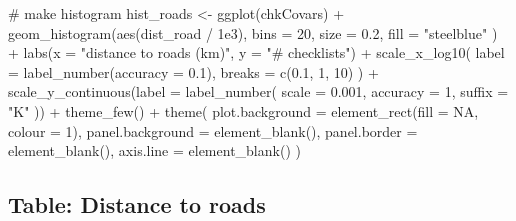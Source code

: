 \documentclass[]{article}
\newenvironment{Shaded}{}{}
\newcommand{\CommentTok}[1]{\textcolor[rgb]{0.00,0.50,0.00}{#1}}
\newcommand{\DataTypeTok}[1]{#1}
\newcommand{\DecValTok}[1]{#1}
\newcommand{\FloatTok}[1]{#1}
\newcommand{\KeywordTok}[1]{\textcolor[rgb]{0.00,0.00,1.00}{#1}}
\newcommand{\NormalTok}[1]{#1}
\newcommand{\OperatorTok}[1]{#1}
\newcommand{\OtherTok}[1]{\textcolor[rgb]{1.00,0.25,0.00}{#1}}
\newcommand{\StringTok}[1]{\textcolor[rgb]{0.00,0.50,0.50}{#1}}
\begin{document}
\begin{Shaded}
\begin{Highlighting}[]

\CommentTok{# make histogram}
\NormalTok{hist_roads <-}\StringTok{ }\KeywordTok{ggplot}\NormalTok{(chkCovars) }\OperatorTok{+}
\StringTok{  }\KeywordTok{geom_histogram}\NormalTok{(}\KeywordTok{aes}\NormalTok{(dist_road }\OperatorTok{/}\StringTok{ }\FloatTok{1e3}\NormalTok{),}
    \DataTypeTok{bins =} \DecValTok{20}\NormalTok{, }\DataTypeTok{size =} \FloatTok{0.2}\NormalTok{, }\DataTypeTok{fill =} \StringTok{"steelblue"}
\NormalTok{  ) }\OperatorTok{+}
\StringTok{  }\KeywordTok{labs}\NormalTok{(}\DataTypeTok{x =} \StringTok{"distance to roads (km)"}\NormalTok{, }\DataTypeTok{y =} \StringTok{"# checklists"}\NormalTok{) }\OperatorTok{+}
\StringTok{  }\KeywordTok{scale_x_log10}\NormalTok{(}
    \DataTypeTok{label =} \KeywordTok{label_number}\NormalTok{(}\DataTypeTok{accuracy =} \FloatTok{0.1}\NormalTok{),}
    \DataTypeTok{breaks =} \KeywordTok{c}\NormalTok{(}\FloatTok{0.1}\NormalTok{, }\DecValTok{1}\NormalTok{, }\DecValTok{10}\NormalTok{)}
\NormalTok{  ) }\OperatorTok{+}
\StringTok{  }\KeywordTok{scale_y_continuous}\NormalTok{(}\DataTypeTok{label =} \KeywordTok{label_number}\NormalTok{(}
    \DataTypeTok{scale =} \FloatTok{0.001}\NormalTok{,}
    \DataTypeTok{accuracy =} \DecValTok{1}\NormalTok{, }\DataTypeTok{suffix =} \StringTok{"K"}
\NormalTok{  )) }\OperatorTok{+}
\StringTok{  }\KeywordTok{theme_few}\NormalTok{() }\OperatorTok{+}
\StringTok{  }\KeywordTok{theme}\NormalTok{(}
    \DataTypeTok{plot.background =} \KeywordTok{element_rect}\NormalTok{(}\DataTypeTok{fill =} \OtherTok{NA}\NormalTok{, }\DataTypeTok{colour =} \DecValTok{1}\NormalTok{),}
    \DataTypeTok{panel.background =} \KeywordTok{element_blank}\NormalTok{(),}
    \DataTypeTok{panel.border =} \KeywordTok{element_blank}\NormalTok{(), }\DataTypeTok{axis.line =} \KeywordTok{element_blank}\NormalTok{()}
\NormalTok{  )}
\end{Highlighting}
\end{Shaded}

\hypertarget{table-distance-to-roads}{%
\subsection{Table: Distance to roads}\label{table-distance-to-roads}}
\end{document}
